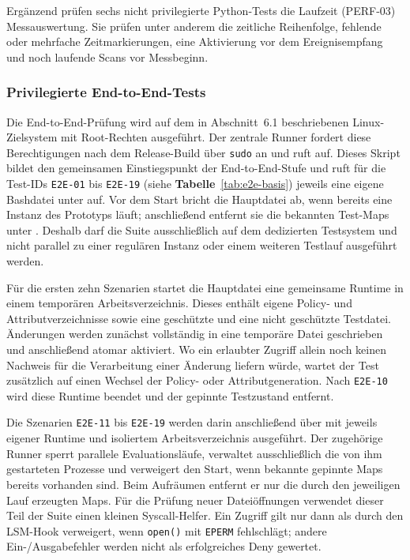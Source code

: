 Ergänzend prüfen sechs nicht privilegierte Python-Tests die Laufzeit (PERF-03) Messauswertung. Sie prüfen
unter anderem die zeitliche Reihenfolge, fehlende oder mehrfache Zeitmarkierungen,
eine Aktivierung vor dem Ereignisempfang und noch laufende Scans vor Messbeginn.

\subsubsection{Privilegierte End-to-End-Tests}

Die End-to-End-Prüfung wird auf dem in Abschnitt~6.1 beschriebenen Linux-Zielsystem mit
Root-Rechten ausgeführt. Der zentrale Runner  fordert diese Berechtigungen nach dem
Release-Build über \texttt{sudo} an und ruft  auf. Dieses Skript bildet den
gemeinsamen Einstiegspunkt der End-to-End-Stufe und
ruft für die Test-IDs \texttt{E2E-01} bis \texttt{E2E-19} (siehe \textbf{Tabelle}~\ref{tab:e2e-basis}) jeweils eine eigene Bashdatei unter
 auf. Vor dem Start bricht die Hauptdatei ab, wenn bereits eine Instanz des
Prototyps läuft; anschließend entfernt sie die bekannten Test-Maps unter
. Deshalb darf die Suite ausschließlich auf dem dedizierten Testsystem
und nicht parallel zu einer regulären Instanz oder einem weiteren Testlauf ausgeführt werden.

Für die ersten zehn Szenarien startet die Hauptdatei eine gemeinsame Runtime in einem temporären
Arbeitsverzeichnis. Dieses enthält eigene Policy- und Attributverzeichnisse sowie eine geschützte
und eine nicht geschützte Testdatei. Änderungen werden zunächst vollständig in eine temporäre
Datei geschrieben und anschließend atomar aktiviert. Wo ein erlaubter Zugriff allein noch keinen
Nachweis für die Verarbeitung einer Änderung liefern würde, wartet der Test zusätzlich auf einen
Wechsel der Policy- oder Attributgeneration. Nach \texttt{E2E-10} wird diese Runtime beendet und
der gepinnte Testzustand entfernt.

Die Szenarien \texttt{E2E-11} bis \texttt{E2E-19} werden darin anschließend über
 mit jeweils eigener Runtime und isoliertem Arbeitsverzeichnis
ausgeführt. Der zugehörige Runner sperrt parallele Evaluationsläufe, verwaltet ausschließlich die
von ihm gestarteten Prozesse und verweigert den Start, wenn bekannte gepinnte Maps bereits
vorhanden sind. Beim Aufräumen entfernt er nur die durch den jeweiligen Lauf erzeugten Maps. Für
die Prüfung neuer Dateiöffnungen verwendet dieser Teil der Suite einen kleinen Syscall-Helfer. Ein
Zugriff gilt nur dann als durch den LSM-Hook verweigert, wenn \texttt{open()} mit \texttt{EPERM}
fehlschlägt; andere Ein-/Ausgabefehler werden nicht als erfolgreiches Deny gewertet.

